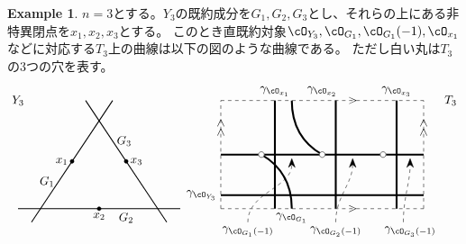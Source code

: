 \documentclass[uplatex,a4paper,dvipdfmx]{jsarticle}
\theoremstyle{plain}
\theoremstyle{definition}
\newtheorem{example}[theorem]{Example}
\begin{document}
\begin{example}
	$n=3$とする。$Y_3$の既約成分を$G_1, G_2, G_3$とし、それらの上にある非特異閉点を$x_1, x_2, x_3$とする。
	このとき直既約対象$\cO_{Y_3}, \cO_{G_1}, \cO_{G_1}(-1), \cO_{x_1}$などに対応する$T_3$上の曲線は以下の図のような曲線である。
	ただし白い丸は$T_3$の$3$つの穴を表す。
	\begin{displaymath}
		\begin{tikzpicture}[scale = 0.4]
			\draw(-10, 8) node{$Y_3$};
			\draw[thick] (-9,-1)--(-3,8);
			\draw[thick] (-10,0)--(2,0);
			\draw[thick] (1,-1)--(-5,8);

			\filldraw[black] (-6, 3.5) circle (4pt);
			\filldraw[black] (-4, 0) circle (4pt);
			\filldraw[black] (-2, 3.5) circle (4pt);

			\draw(-6, 3.5) node[left]{$x_1$};
			\draw(-4, 0) node[below]{$x_2$};
			\draw(-2, 3.5) node[right]{$x_3$};

			\draw(-7, 2) node[left]{$G_1$};
			\draw(-2, 0) node[below]{$G_2$};
			\draw(-3, 5) node[right]{$G_3$};

			\draw(22, 8) node{$T_3$};
			\draw[dashed] (5,0)--(20,0);
			\draw(14.75, 0) node{$>$};
			\draw[dashed] (5,0)--(5,8);
			\draw(5, 6) node{\rotatebox{90}{$>>$}};
			\draw[dashed] (5,8)--(20,8);
			\draw(14.75, 8) node{$>$};
			\draw[dashed] (20,0)--(20,8);
			\draw(20, 6) node{\rotatebox{90}{$>>$}};

			\draw[ultra thick] (5, 1)--(20, 1);
			\draw[ultra thick] (5, 4)--(20, 4);
			\draw(5, 1) node[left]{$\gamma_{\cO_{Y_3}}$};


			\draw[ultra thick] (8+1, 0)--(8+1, 8);
			\draw(8+1, 8) node[above]{$\gamma_{\cO_{x_1}}$};
			\draw[ultra thick] (12.5+1, 0)--(12.5+1, 8);
			\draw(12.5, 8) node[above]{$\gamma_{\cO_{x_2}}$};
			\draw[ultra thick] (17+1, 0)--(17+1, 8);
			\draw(17+1, 8) node[above]{$\gamma_{\cO_{x_3}}$};

			\draw[ultra thick] (8, 4) to[out=-30,in=90] (10.25, 0);
			\draw[ultra thick] (10.25, 8) to[out=-90,in=150] (12.5, 4);
			\draw(10.25, 0) node[below]{$\gamma_{\cO_{G_1}}$};
			\foreach \u in {8, 12.5, 17}
				{
					\filldraw[white] (\u, 4) circle (6pt);
					\draw[black] (\u, 4) circle (6pt);
				}

			\draw[dashed, -{Stealth[length=3mm]}] (7, -1) to[out=90, in=-90] (10.25, 3.75);
			\draw(7, -1) node[below]{$\gamma_{\cO_{G_1}(-1)}$};
			\draw[dashed, -{Stealth[length=3mm]}] (13.5, -1) to[out=90, in=-90] (14.75, 3.75);
			\draw(13.5, -1) node[below]{$\gamma_{\cO_{G_2}(-1)}$};
			\draw[dashed, -{Stealth[length=3mm]}] (18.5, -1) to[out=90, in=-90] (19, 3.75);
			\draw(19, -1) node[below]{$\gamma_{\cO_{G_3}(-1)}$};


\end{tikzpicture}
\end{displaymath}
\end{example}
\end{document}
